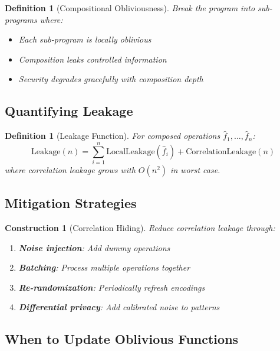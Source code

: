 \documentclass[11pt,final,hidelinks]{article}
\newtheorem{definition}[theorem]{Definition}
\newtheorem{construction}[theorem]{Construction}
\begin{document}
\begin{definition}[Compositional Obliviousness]
Break the program into sub-programs where:
\begin{itemize}
    \item Each sub-program is locally oblivious
    \item Composition leaks controlled information
    \item Security degrades gracefully with composition depth
\end{itemize}
\end{definition}

\subsection{Quantifying Leakage}

\begin{definition}[Leakage Function]
For composed operations $\hat{f}_1, \ldots, \hat{f}_n$:
\begin{equation}
\text{Leakage}(n) = \sum_{i=1}^{n} \text{LocalLeakage}(\hat{f}_i) + \text{CorrelationLeakage}(n)
\end{equation}
where correlation leakage grows with $O(n^2)$ in worst case.
\end{definition}

\subsection{Mitigation Strategies}

\begin{construction}[Correlation Hiding]
Reduce correlation leakage through:
\begin{enumerate}
    \item \textbf{Noise injection}: Add dummy operations
    \item \textbf{Batching}: Process multiple operations together
    \item \textbf{Re-randomization}: Periodically refresh encodings
    \item \textbf{Differential privacy}: Add calibrated noise to patterns
\end{enumerate}
\end{construction}

\subsection{When to Update Oblivious Functions}
\end{document}
